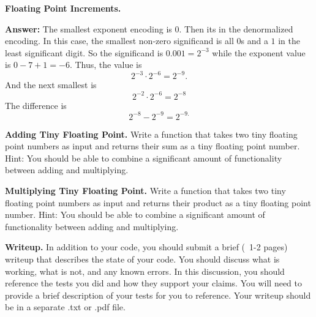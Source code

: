 \documentclass{exam}
\begin{document}
\begin{questions}
\question[10]
\textbf{Floating Point Increments.}

\textbf{Answer:}
The smallest exponent encoding is $0$. Then its in the denormalized encoding. In this case, the smallest non-zero significand is all $0$s and a $1$ in the least significant digit. So the significand is $0.001=2^{-3}$ while the exponent value is $0-7+1=-6$. Thus, the value is
$$2^{-3}\cdot2^{-6}=2^{-9}.$$
And the next smallest is
$$2^{-2}\cdot2^{-6}=2^{-8}$$
The difference is
$$2^{-8}-2^{-9}=2^{-9.}$$

\question[20]
\textbf{Adding Tiny Floating Point.}
Write a function that takes two tiny floating point numbers as input and returns their sum as a tiny floating point number. 
Hint: You should be able to combine a significant amount of functionality between adding and multiplying. 

\question[20]
\textbf{Multiplying Tiny Floating Point.}
Write a function that takes two tiny floating point numbers as input and returns their product as a tiny floating point number. 
Hint: You should be able to combine a significant amount of functionality between adding and multiplying. 

\question[10]
\textbf{Writeup.}
In addition to your code, you should submit a brief (~1-2 pages) writeup that describes the state of your code. 
You should discuss what is working, what is not, and any known errors. 
In this discussion, you should reference the tests you did and how they support your claims. 
You will need to provide a brief description of your tests for you to reference. 
Your writeup should be in a separate .txt or .pdf file. 
\end{questions}
\end{document}

